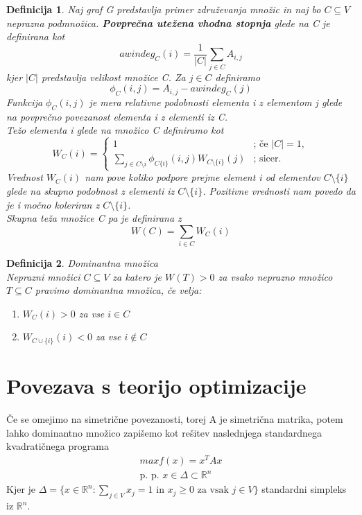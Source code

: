 \documentclass[a4paper]{article}
\newtheorem{definition}{Definicija}[section]
\begin{document}
\begin{definition}
Naj graf G predstavlja primer združevanja množic in naj bo $C \subseteq V$ neprazna podmnožica. \textbf{Povprečna utežena vhodna stopnja} glede na C je definirana kot
$$awindeg_C(i) = \frac{1}{\lvert C \rvert}\sum_{j\in C}A_{i,j}$$
kjer $\lvert C \rvert$ predstavlja velikost množice C. Za $j\in C$ definiramo
$$\phi_C(i,j) = A_{i,j} - awindeg_C(j)$$
Funkcija $\phi_C(i,j)$ je \textit{mera relativne podobnosti} elementa i z elementom j glede na povprečno povezanost elementa i z elementi iz C.\\
\textit{Težo elementa} i glede na množico C definiramo kot
$$W_C(i)=\begin{cases}
1& \text{; če $\lvert C \rvert = 1$},\\
\sum_{j\in C\setminus{i}}\phi_{C\{i\}}(i,j)W_{C\setminus\{i\}}(j)& \text{; sicer}.
\end{cases}$$
Vrednost $W_C(i)$ nam pove koliko podpore prejme element i od elementov $C\setminus\{i\}$ glede na skupno podobnost z elementi iz $C\setminus\{i\}$. Pozitivne vrednosti nam povedo da je i močno
koleriran z $C\setminus\{i\}$.\\
\textit{Skupna teža množice} C pa je definirana z
$$W(C) = \sum_{i\in C}W_C(i)$$
\end{definition}
\begin{definition}{Dominantna množica}\\
Neprazni množici $C \subseteq V$ za katero je $W(T) > 0$ za vsako neprazno množico $T \subseteq C$ pravimo dominantna množica, če velja:
\begin{enumerate}
\item $W_C(i) > 0$ za vse $i \in C$
\item $W_{C\cup\{i\}}(i) < 0$ za vse $i \notin C$
\end{enumerate}
\end{definition}

\section{Povezava s teorijo optimizacije}
Če se omejimo na simetrične povezanosti, torej A je simetrična matrika, potem lahko dominantno množico zapišemo kot rešitev naslednjega standardnega kvadratičnega programa
\begin{gather}
max f(x) = x^T A x \\
\text{p. p. } x\in\Delta \subset \mathbb{R}^n
\end{gather}
Kjer je $\Delta = \{x\in\mathbb{R}^n: \sum_{j\in V}x_j = 1 \text{ in } x_j \geq 0 \text{ za vsak } j\in V\}$ standardni simpleks iz $\mathbb{R}^n$.
\end{document}
